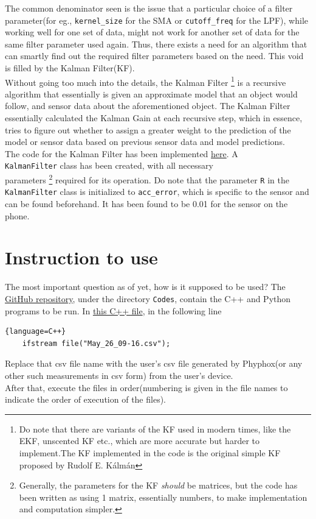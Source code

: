 \documentclass[oneside]{book}
\begin{document}
\bigskip
The common denominator seen is the issue that a particular choice of a filter parameter(for eg., \verb|kernel_size| for the SMA or \verb|cutoff_freq| for the LPF), while working well for one set of data, might not work for another set of data for the same filter parameter used again. Thus, there exists a need for an algorithm that can smartly find out the required filter parameters based on the need. This void is filled by the Kalman Filter(KF).\\ 
\bigskip
Without going too much into the details, the Kalman Filter \footnote{Do note that there are variants of the KF used in modern times, like the EKF, unscented KF etc., which are more accurate but harder to implement.The KF implemented in the code is the original simple KF proposed by Rudolf E. Kálmán} is a recursive algorithm that essentially is given an approximate model that an object would follow, and sensor data about the aforementioned object. The Kalman Filter essentially calculated the Kalman Gain at each recursive step, which in essence, tries to figure out whether to assign a greater weight to the prediction of the model or sensor data based on previous sensor data and model predictions. \\ \bigskip
The code for the Kalman Filter has been implemented \href{https://github.com/HarryNyquist/Odometry/blob/main/Codes/1_KalmanFilter.cpp}{here}. A \\ \verb|KalmanFilter| class has been created, with all necessary \\ parameters \footnote{Generally, the parameters for the KF \textit{should} be matrices, but the code has been written as using 1 matrix, essentially numbers, to make implementation and computation simpler.} required for its operation. Do note that the parameter \verb|R| in the \verb|KalmanFilter| class is initialized to \verb|acc_error|, which is specific to the sensor and can be found beforehand. It has been found to be 0.01 for the sensor on the phone. \newpage
\chapter{Instruction to use}
The most important question as of yet, how is it supposed to be used? The \href{https://github.com/HarryNyquist/Odometry}{GitHub repository}, under the directory \verb|Codes|, contain the C++ and Python programs to be run. In \href{https://github.com/HarryNyquist/Odometry/blob/main/Codes/1_KalmanFilter.cpp}{this C++ file}, in the following line
\begin{lstlisting}{language=C++}
    ifstream file("May_26_09-16.csv");
\end{lstlisting}
Replace that csv file name with the user's csv file generated by Phyphox(or any other such measurements in csv form) from the user's device.\\
After that, execute the files in order(numbering is given in the file names to indicate the order of execution of the files). 
\end{document}
